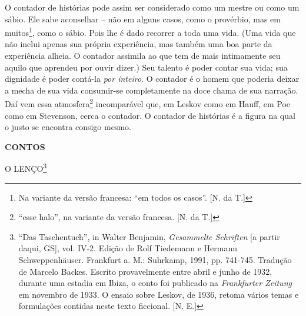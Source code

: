 O contador de histórias pode assim ser considerado como um mestre ou
como um sábio. Ele sabe aconselhar -- não em alguns casos, como o
provérbio, mas em muitos\footnote{Na variante da versão francesa: ``em
  todos os casos''. {[}N. da T.{]}}, como o sábio. Pois lhe é dado
recorrer a toda uma vida. (Uma vida que não inclui apenas sua própria
experiência, mas também uma boa parte da experiência alheia. O contador
assimila ao que tem de mais intimamente seu aquilo que aprendeu por
ouvir dizer.) Seu talento é poder contar sua vida; sua dignidade é poder
contá-la \emph{por inteiro}. O contador é o homem que poderia deixar a
mecha de sua vida consumir-se completamente na doce chama de sua
narração. Daí vem essa atmosfera\footnote{``esse halo'', na variante da
  versão francesa. {[}N. da T.{]}} incomparável que, em Leskov como em
Hauff, em Poe como em Stevenson, cerca o contador. O contador de
histórias é a figura na qual o justo se encontra consigo mesmo.

\textbf{CONTOS}

O LENÇO\footnote{``Das Taschentuch'', in Walter Benjamin,
  \emph{Gesammelte Schriften} {[}a partir daqui, GS{]}, vol. IV-2.
  Edição de Rolf Tiedemann e Hermann Schweppenhäuser. Frankfurt a. M.:
  Suhrkamp, 1991, pp. 741-745. Tradução de Marcelo Backes. Escrito
  provavelmente entre abril e junho de 1932, durante uma estadia em
  Ibiza, o conto foi publicado na \emph{Frankfurter Zeitung} em novembro
  de 1933. O ensaio sobre Leskov, de 1936, retoma vários temas e
  formulações contidas neste texto ficcional. {[}N. E.{]}}

